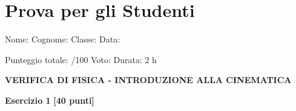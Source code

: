 \documentclass{report} \usepackage[T1]{fontenc} \usepackage[italian]{babel}
\begin{document}
\chapter{Prova per gli Studenti}\label{appendix_test}
﻿Nome:\hspace{25mm} Cognome:\hspace{20mm} Classe:\hspace{12mm} Data:

\vspace{5mm}

\noindent Punteggio totale:\hspace{17mm} /100\hspace{20mm} Voto:\hspace{15mm}
Durata: 2 h

\vspace{10mm}

\noindent \textbf{VERIFICA DI FISICA - INTRODUZIONE ALLA CINEMATICA}

\vspace{5mm}

\noindent\textbf{Esercizio 1} \hfill \textbf{[40 punti]}
\end{document}
